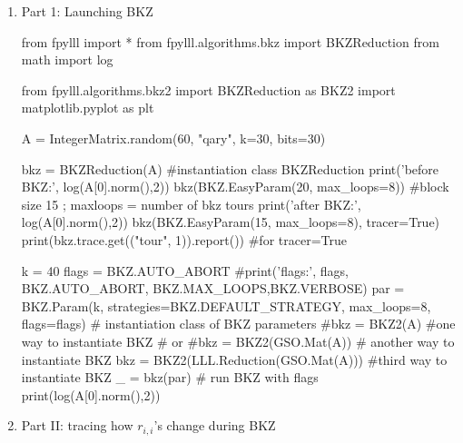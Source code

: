 \documentclass[11pt]{exam}
\theoremstyle{definition}
\begin{document}
\begin{enumerate}
	\item Part 1: Launching BKZ 
	
	\begin{python}
		from fpylll import *
		from fpylll.algorithms.bkz import BKZReduction
		from math import log
		
		from fpylll.algorithms.bkz2 import BKZReduction as BKZ2
		import matplotlib.pyplot as plt

		A = IntegerMatrix.random(60, "qary", k=30, bits=30)
		
		bkz = BKZReduction(A) #instantiation class BKZReduction
		print('before BKZ:', log(A[0].norm(),2))
		bkz(BKZ.EasyParam(20, max_loops=8)) #block size  15 ; maxloops = number of bkz tours
		print('after BKZ:', log(A[0].norm(),2))
		bkz(BKZ.EasyParam(15, max_loops=8), tracer=True)
		print(bkz.trace.get(("tour", 1)).report()) #for tracer=True
		
		
		
		k = 40
		flags = BKZ.AUTO_ABORT
		#print('flags:', flags, BKZ.AUTO_ABORT, BKZ.MAX_LOOPS,BKZ.VERBOSE)
		par = BKZ.Param(k, strategies=BKZ.DEFAULT_STRATEGY, max_loops=8, flags=flags) # instantiation class of BKZ parameters
		#bkz = BKZ2(A) #one way to instantiate BKZ # or
		#bkz = BKZ2(GSO.Mat(A)) # another way to instantiate BKZ
		bkz = BKZ2(LLL.Reduction(GSO.Mat(A))) #third way to instantiate BKZ
		_ = bkz(par) # run BKZ with flags
		print(log(A[0].norm(),2))
	\end{python}
	\item Part II: tracing how $r_{i,i}$'s change during BKZ
\end{enumerate}
\end{document}
